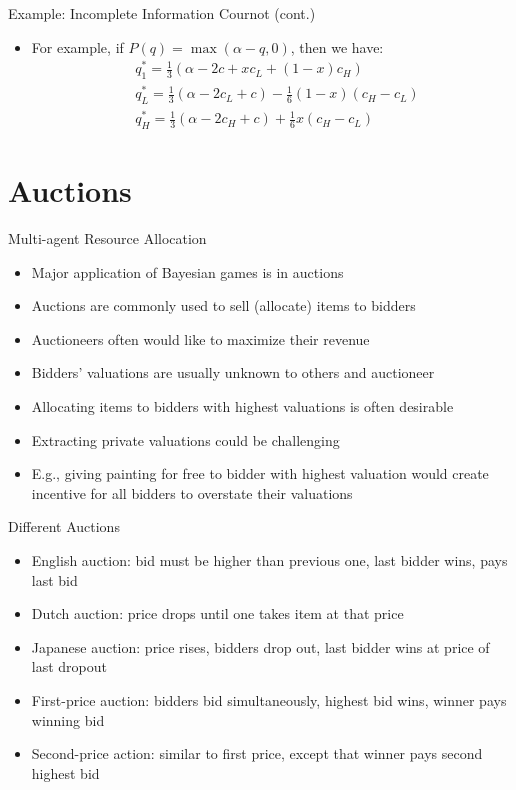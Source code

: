 \documentclass[11pt,aspectratio=169]{beamer}
\begin{document}
  \begin{frame}{Example: Incomplete Information Cournot (cont.)}
   \begin{itemize}
    \item For example, if $P(q) = \max(\alpha - q, 0)$, then we have:
    \vspace{1.2em}
    \begin{align*}
     & q_1^*=\frac{1}{3}(\alpha - 2c + x c_L + (1-x) c_H) \\[1.2em]
     & q_L^*=\frac{1}{3}(\alpha - 2c_L + c) - \frac{1}{6}(1 - x)(c_H - c_L) \\[1.2em]
     & q_H^*=\frac{1}{3}(\alpha - 2c_H + c) + \frac{1}{6}x(c_H - c_L)
    \end{align*}
   \end{itemize}
  \end{frame}
  
 \section{Auctions}
 
  \begin{frame}{Multi-agent Resource Allocation}
   \begin{itemize}[<+->]
   \setlength{\itemsep}{0.7em}
    \item Major application of Bayesian games is in \alert{auctions}
    \item Auctions are commonly used to sell (allocate) items to \alert{bidders}
    \item Auctioneers often would like to maximize their \alert{revenue}
    \item Bidders' valuations are usually \alert{unknown} to others and auctioneer
    \item Allocating items to bidders with \alert{highest valuations} is often desirable
    \item Extracting private valuations could be challenging
    \item E.g., giving painting for free to bidder with highest valuation would create incentive for all bidders to overstate their valuations
   \end{itemize}
  \end{frame}


  \begin{frame}{Different Auctions}
   \begin{itemize}[<+->] \small
   \setlength{\itemsep}{1.2em}
    \item \alert{English auction}: bid must be higher than previous one, last bidder wins, pays last bid
    \item \alert{Dutch auction}: price drops until one takes item at that price
    \item \alert{Japanese auction}: price rises, bidders drop out, last bidder wins at price of last dropout
    \item \alert{First-price auction}: bidders bid simultaneously, highest bid wins, winner pays winning bid
    \item \alert{Second-price action}: similar to first price, except that winner pays second highest bid
   \end{itemize}
  \end{frame}
\end{document}
